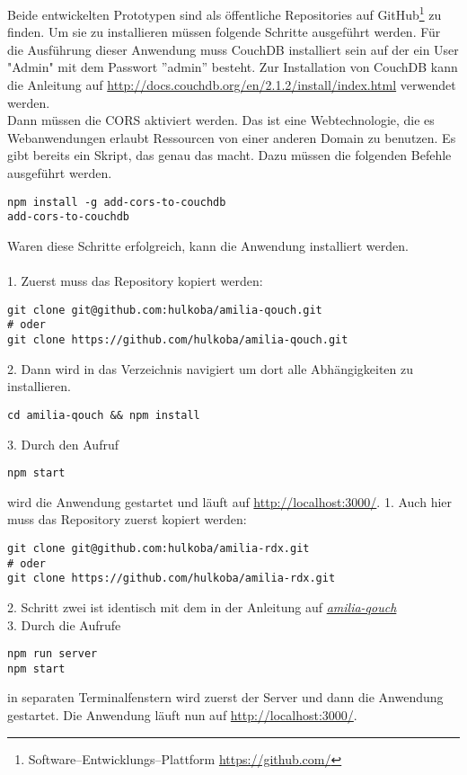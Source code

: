 Beide entwickelten Prototypen sind als öffentliche Repositories auf GitHub\footnote{Software--Entwicklungs--Plattform \url{https://github.com/}} zu finden. 
Um sie zu installieren müssen folgende Schritte ausgeführt werden.
%
%
Für die Ausführung dieser Anwendung muss CouchDB installiert sein auf der ein User "Admin" mit dem Passwort ''admin'' besteht.
Zur Installation von CouchDB kann die Anleitung auf \url{http://docs.couchdb.org/en/2.1.2/install/index.html} verwendet werden.\\
Dann müssen die \gls{CORS} aktiviert werden.
Das ist eine Webtechnologie, die es Webanwendungen erlaubt Ressourcen von einer anderen Domain zu benutzen.
Es gibt bereits ein Skript, das genau das macht. Dazu müssen die folgenden Befehle ausgeführt werden.
%
\begin{lstlisting}
npm install -g add-cors-to-couchdb
add-cors-to-couchdb
\end{lstlisting}
%
Waren diese Schritte erfolgreich, kann die Anwendung installiert werden.\\\\
1. Zuerst muss das Repository kopiert werden:
\begin{lstlisting}
git clone git@github.com:hulkoba/amilia-qouch.git
# oder
git clone https://github.com/hulkoba/amilia-qouch.git
\end{lstlisting}
2. Dann wird in das Verzeichnis navigiert um dort alle Abhängigkeiten zu installieren.
\begin{lstlisting}
cd amilia-qouch && npm install
\end{lstlisting}
3. Durch den Aufruf
\begin{lstlisting}
npm start
\end{lstlisting}
wird die Anwendung gestartet und läuft auf \url{http://localhost:3000/}.
%
%
%
1. Auch hier muss das Repository zuerst kopiert werden:
\begin{lstlisting}
git clone git@github.com:hulkoba/amilia-rdx.git
# oder
git clone https://github.com/hulkoba/amilia-rdx.git
\end{lstlisting}
2. Schritt zwei ist identisch mit dem in der Anleitung auf \hyperref[chap:install:qouch]{\it{amilia-qouch}}\\
3. Durch die Aufrufe
\begin{lstlisting}
npm run server
npm start
\end{lstlisting}
in separaten Terminalfenstern wird zuerst der Server und dann die Anwendung gestartet.
Die Anwendung läuft nun auf \url{http://localhost:3000/}.